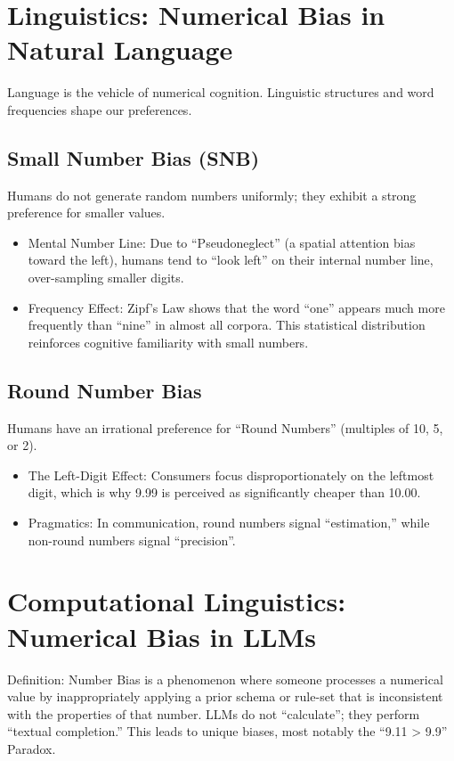 \section{Linguistics: Numerical Bias in Natural Language}

Language is the vehicle of numerical cognition. Linguistic structures and word frequencies shape our preferences.

\subsection{Small Number Bias (SNB)}

Humans do not generate random numbers uniformly; they exhibit a strong preference for smaller values.
\begin{itemize}
    \item Mental Number Line: Due to “Pseudoneglect” (a spatial attention bias toward the left), humans tend to “look left” on their internal number line, over-sampling smaller digits.
    \item Frequency Effect: Zipf’s Law shows that the word “one” appears much more frequently than “nine” in almost all corpora. This statistical distribution reinforces cognitive familiarity with small numbers.
\end{itemize}

\subsection{Round Number Bias}

Humans have an irrational preference for “Round Numbers” (multiples of 10, 5, or 2).
\begin{itemize}
    \item The Left-Digit Effect: Consumers focus disproportionately on the leftmost digit, which is why 9.99 is perceived as significantly cheaper than 10.00.
    \item Pragmatics: In communication, round numbers signal “estimation,” while non-round numbers signal “precision”.
\end{itemize}

\section{Computational Linguistics: Numerical Bias in LLMs}

Definition: Number Bias is a phenomenon where someone processes a numerical value by inappropriately applying a prior schema or rule-set that is inconsistent with the properties of that number. LLMs do not “calculate”; they perform “textual completion.” This leads to unique biases, most notably the “9.11 > 9.9” Paradox.

